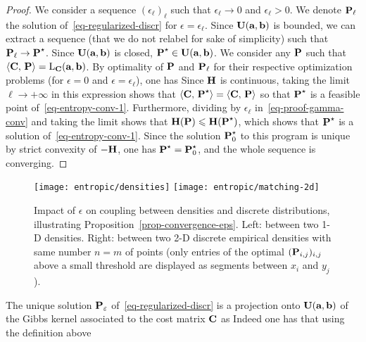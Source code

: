\begin{proof}
	 We consider a sequence $(\epsilon_\ell)_\ell$ such that $\epsilon_\ell \rightarrow 0$ and $\epsilon_\ell > 0$.	
 	We denote $\P_\ell$ the solution of~\eqref{eq-regularized-discr} for $\epsilon=\epsilon_\ell$. 
	Since $\CouplingsD(\a,\b)$ is bounded, we can extract a sequence (that we do not relabel for sake of simplicity) such that $\P_\ell \rightarrow \P^\star$. Since $\CouplingsD(\a,\b)$ is closed, $\P^\star \in \CouplingsD(\a,\b)$. We consider any $\P$ such that $\dotp{\C}{\P} = \MKD_\C(\a,\b)$. By optimality of $\P$ and $\P_\ell$ for their respective optimization problems (for $\epsilon=0$ and $\epsilon=\epsilon_\ell$), one has
 	Since $\HD$ is continuous, taking the limit $\ell \rightarrow +\infty$ in this expression shows that 
 	$\dotp{\C}{\P^\star} = \dotp{\C}{\P}$ so that $\P^\star$ is a feasible point of~\eqref{eq-entropy-conv-1}. Furthermore, dividing by $\epsilon_\ell$ in~\eqref{eq-proof-gamma-conv} and taking the limit shows that 
 	$\HD(\P) \leq \HD(\P^\star)$, which shows that $\P^\star$ is a solution of~\eqref{eq-entropy-conv-1}. Since the solution $\P_0^\star$ to this program is unique by strict convexity of $-\HD$, one has $\P^\star = \P_0^\star$, and the whole sequence is converging. 
\end{proof}


\begin{figure}
\centering
\texttt{[image: entropic/densities]}
\texttt{[image: entropic/matching-2d]}
\caption{\label{fig-entropic}
Impact of $\epsilon$ on coupling between densities and discrete distributions, illustrating Proposition~\ref{prop-convergence-eps}.
%
Left: between two 1-D densities. Right: between two 2-D discrete empirical densities with same number $n=m$ of points (only entries of the optimal $(\P_{i,j})_{i,j}$ above a small threshold are displayed as segments between $x_i$ and $y_j$).
}
\end{figure}


The unique solution $\P_\epsilon$ of~\eqref{eq-regularized-discr} is a projection onto $\CouplingsD(\a,\b)$ of the Gibbs kernel associated to the cost matrix $\C$ as
Indeed one has that using the definition above



